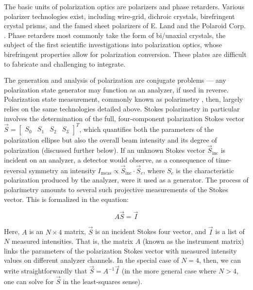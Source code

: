 \documentclass[footinbib,aps,prl,twocolumn,superscriptaddress]{revtex4-1}
\begin{document}
The basic units of polarization optics are polarizers and phase retarders. Various polarizer technologies exist, including wire-grid, dichroic crystals, birefringent crystal prisms, and the famed sheet polarizers of E. Land and the Polaroid Corp. \cite{Damask2005, Shurcliff1962}. Phase retarders most commonly take the form of bi/unaxial crystals, the subject of the first scientific investigations into polarization optics, whose birefringent properties allow for polarization conversion. These plates are difficult to fabricate and challenging to integrate.

The generation and analysis of polarization are conjugate problems --- any polarization state generator may function as an analyzer, if used in reverse. Polarization state measurement, commonly known as polarimetry \cite{Azzam2016}, then, largely relies on the same technologies detailed above. Stokes polarimetry in particular involves the determination of the full, four-component polarization Stokes vector $\vec{S} = \begin{bmatrix} S_0 & S_1 & S_2 & S_3 \end{bmatrix}^T$, which quantifies both the parameters of the polarization ellipse but also the overall beam intensity and its degree of polarization (discussed further below). If an unknown Stokes vector $\vec{S}_{\text{inc}}$ is incident on an analyzer, a detector would observe, as a consequence of time-reversal symmetry an intensity $I_{\text{meas}} \propto  \vec{S}_{\text{inc}} \cdot \vec{S}_{c}$, where $S_c$ is the characteristic polarization produced by the analyzer, were it used as a generator. The process of polarimetry amounts to several such projective measurements of the Stokes vector. This is formalized in the equation:

\begin{equation}
	A\vec{S} = \vec{I}
\end{equation}

Here, $A$ is an $N \times 4$ matrix, $\vec{S}$ is an incident Stokes four vector, and $\vec{I}$ is a list of $N$ measured intensities. That is, the matrix $A$ (known as the instrument matrix) links the parameters of the polarization Stokes vector with measured intensity values on different analyzer channels. In the special case of $N=4$, then, we can write straightforwardly that $\vec{S} = A^{-1} \vec{I}$ (in the more general case where $N > 4$, one can solve for $\vec{S}$ in the least-squares sense). 
\end{document}
